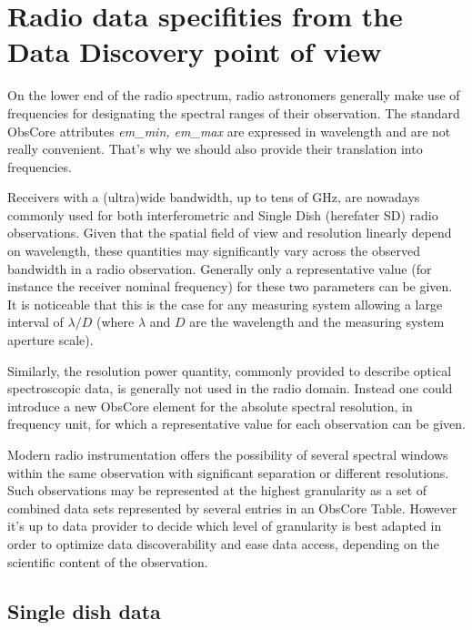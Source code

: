 \documentclass[11pt,a4paper]{ivoa}
\begin{document}
\section{Radio data specifities from the Data Discovery point of view}
\label{sec:specificities}

On the lower end of the radio spectrum, radio astronomers generally make use of 
frequencies for designating the spectral ranges of their observation. The standard 
ObsCore attributes \emph{em\_min, em\_max} are expressed in wavelength and are not really convenient. 
That's why we should also provide their translation into frequencies. 
        
Receivers with a (ultra)wide bandwidth, up to tens of GHz, are 
nowadays commonly used for both interferometric and Single Dish (herefater SD) radio observations. 
Given that the spatial field of view and resolution linearly depend on wavelength, these quantities may significantly vary across the observed bandwidth in a radio observation. 
Generally only a representative value (for instance the
receiver nominal frequency) for these two parameters can be given. It is 
noticeable that this is the case for any measuring system allowing a large interval of 
$\lambda/D$ (where $\lambda$ and $D$ are the wavelength and the measuring system
aperture scale).
 
Similarly, the resolution power quantity, commonly provided to describe optical spectroscopic data, is generally not used in the radio domain.
Instead one could introduce a new ObsCore element for the absolute spectral resolution, in frequency unit, for which a representative value for each observation can be given. 

Modern radio instrumentation offers the possibility of several  spectral windows within the same observation with significant separation or different resolutions.
Such observations may be represented at the highest granularity as  a set of combined data sets represented by several entries in an ObsCore Table. However it's up to data provider to decide which level of granularity is best adapted in order to optimize data discoverability and ease data access, depending on the scientific content of the observation.



\subsection{Single dish data}\label{subsec:sd}
\end{document}
